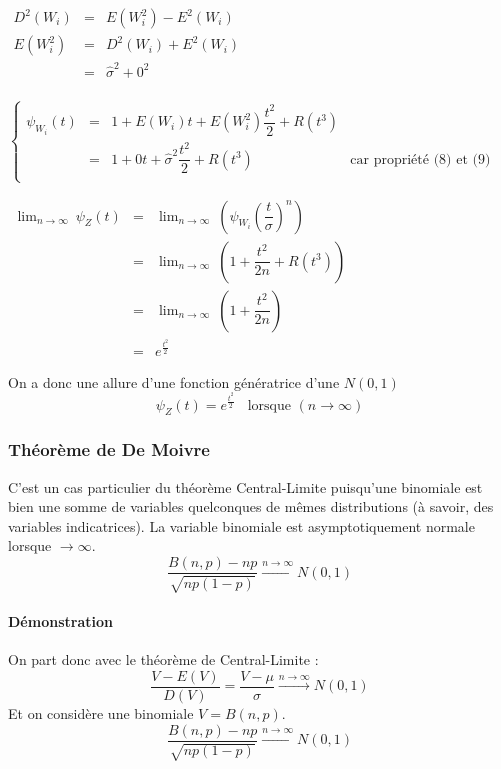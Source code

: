 \begin{center}
$\boxed{\begin{array}{LCL}
D^2(W_i) &=& E(W_i^2) - E^2(W_i)\\
E(W_i^2) &=& D^2(W_i) + E^2(W_i)\\
         &=& \widehat{\sigma}^2 + 0^2\\
\end{array}}$
\end{center}
\begin{center}
$\left\{\begin{array}{LCLC}
\psi_{W_i}(t) &=& 1 + E ( W_i ) t + E (W_i^2) \dfrac{t^2}{2}+R(t^3)\\
              &=& 1 + 0 t + \widehat{\sigma}^2 \dfrac{t^2}{2} + R(t^3)&\text{car propriété (8) et (9)}\\
\end{array}\right.$
\end{center}
\begin{center}
$\begin{array}{LCL}
\lim_{n\rightarrow\infty}\ \psi_{Z}(t) &=& \lim_{n\rightarrow\infty}\ \left( \psi_{W_i} \left( \dfrac{t}{\sigma} \right)^n \right) \\[0.3cm]
            &=& \lim_{n\rightarrow\infty}\ \left( 1 + \dfrac{t^2}{2n} + R(t^3) \right)\\
            &=& \lim_{n\rightarrow\infty}\ \left( 1 + \dfrac{t^2}{2n} \right)\\
            &=& e^{\frac{t^2}{2}}
\end{array}$
\end{center}
On a donc une allure d'une fonction génératrice d'une $N(0,1)$
$$\boxed{\psi_{Z}(t) = e^{\frac{t^2}{2}}\ \ \ \ \text{lorsque }(n\rightarrow\infty)}$$









\newpage
\subsubsection{Théorème de De Moivre}
C'est un cas particulier du théorème Central-Limite puisqu'une binomiale est bien une somme de variables quelconques de mêmes distributions (à savoir, des variables indicatrices). La variable binomiale est asymptotiquement normale lorsque $\rightarrow\infty$.
$$\boxed{\dfrac{B(n,p)-np}{\sqrt{np(1-p)}} \stackrel{n\rightarrow\infty}{\rightarrow} N(0,1)}$$
\paragraph{Démonstration}
On part donc avec le théorème de Central-Limite :
$$\dfrac{V-E(V)}{D(V)} = \dfrac{V-\mu}{\sigma} \stackrel{n\rightarrow\infty}{\rightarrow} N(0,1)$$
Et on considère une binomiale $V = B(n,p)$.
$$\boxed{\dfrac{B(n,p)-np}{\sqrt{np(1-p)}} \stackrel{n\rightarrow\infty}{\rightarrow} N(0,1)}$$

